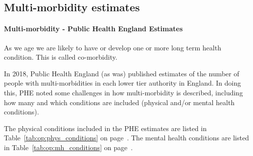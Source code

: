 \subsection{Multi-morbidity estimates}
\paragraph{Multi-morbidity - Public Health England Estimates} As we age we are likely to have or develop one or more long term health condition. This is called co-morbidity.

In 2018, Public Health England (as was) published estimates of the number of people with multi-morbidities in each lower tier authority in England. In doing this, PHE noted some challenges in how multi-morbidity is described, including how many and which conditions are included (physical and/or mental health conditions).

The physical conditions included in the PHE estimates are listed in Table~\ref{tab:op:phys_conditions} on page~\pageref{tab:op:phys_conditions}. The mental health conditions are listed in Table~\ref{tab:op:mh_conditions} on page~\pageref{tab:op:mh_conditions}.

